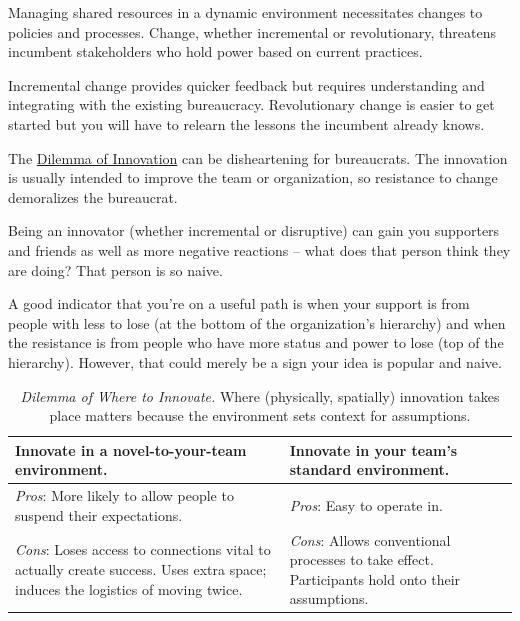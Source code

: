Managing shared resources in a dynamic environment necessitates changes to policies and processes. Change, whether incremental or revolutionary, threatens incumbent stakeholders who hold power based on current practices. 

Incremental change provides quicker feedback but requires understanding and integrating with the existing bureaucracy. Revolutionary change is easier to get started but you will have to relearn the lessons the incumbent already knows.

The \hyperref[table:dilemma-personal-disruptive-or-iterative]{Dilemma of Innovation} can be disheartening for bureaucrats. The innovation is usually intended to improve the team or organization, so resistance to change demoralizes the bureaucrat. 

Being an innovator (whether incremental or disruptive) can gain you supporters and friends as well as more negative reactions -- what does that person think they are doing? That person is so naive.

A good indicator that you're on a useful path is when your support is from people with less to lose (at the bottom of the organization's hierarchy) and when the resistance is from people who have more status and power to lose (top of the hierarchy). However, that could merely be a sign your idea is popular and naive. 




\begin{center}
\begin{table}[H] %
\begin{tabular}{ | m{\dilemmatablewidth}| m{\dilemmatablewidth} | } 
  \hline
  \textbf{Innovate in a novel-to-your-team environment.} &
  \textbf{Innovate in your team's standard environment.} \\
  \hline
  \textit{Pros}: More likely to allow people to suspend their expectations.  & 
  \textit{Pros}: Easy to operate in. \\
  \hline
  \textit{Cons}: Loses access to connections vital to actually create success. Uses extra space; induces the logistics of moving twice. & 
  \textit{Cons}: Allows conventional processes to take effect. Participants hold onto their assumptions. \\
  \hline
\end{tabular}
\caption{
\textit{Dilemma of Where to Innovate.}
Where (physically, spatially) innovation takes place matters because the environment sets context for assumptions.
}
\label{table:dilemma-personal-where-to-innovate}
\end{table}
\end{center}

